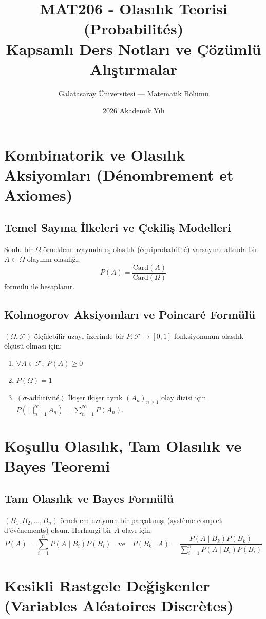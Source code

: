 \documentclass[11pt,a4paper]{report}
\title{\textbf{\Huge MAT206 - Olasılık Teorisi (Probabilités)}\\\Large Kapsamlı Ders Notları ve Çözümlü Alıştırmalar}
\author{Galatasaray Üniversitesi --- Matematik Bölümü}
\date{2026 Akademik Yılı}
\begin{document}
\shorthandoff{=}
\maketitle

\chapter{Kombinatorik ve Olasılık Aksiyomları (Dénombrement et Axiomes)}
\section{Temel Sayma İlkeleri ve Çekiliş Modelleri}
Sonlu bir $\Omega$ örneklem uzayında eş-olasılık (équiprobabilité) varsayımı altında bir $A \subset \Omega$ olayının olasılığı:
\[ P(A) = \frac{\text{Card}(A)}{\text{Card}(\Omega)} \]
formülü ile hesaplanır.

\section{Kolmogorov Aksiyomları ve Poincaré Formülü}
$(\Omega, \mathcal{F})$ ölçülebilir uzayı üzerinde bir $P: \mathcal{F} \to [0,1]$ fonksiyonunun olasılık ölçüsü olması için:
\begin{enumerate}
    \item $\forall A \in \mathcal{F}, \; P(A) \ge 0$
    \item $P(\Omega) = 1$
    \item $(\sigma\text{-additivité})$ İkişer ikişer ayrık $(A_n)_{n \ge 1}$ olay dizisi için $P\left(\bigsqcup_{n=1}^\infty A_n\right) = \sum_{n=1}^\infty P(A_n)$.
\end{enumerate}

\chapter{Koşullu Olasılık, Tam Olasılık ve Bayes Teoremi}
\section{Tam Olasılık ve Bayes Formülü}
$(B_1, B_2, \dots, B_n)$ örneklem uzayının bir parçalanışı (système complet d'événements) olsun. Herhangi bir $A$ olayı için:
\[ P(A) = \sum_{i=1}^n P(A \mid B_i) P(B_i) \quad \text{ve} \quad P(B_k \mid A) = \frac{P(A \mid B_k) P(B_k)}{\sum_{i=1}^n P(A \mid B_i) P(B_i)} \]

\chapter{Kesikli Rastgele Değişkenler (Variables Aléatoires Discrètes)}
\end{document}
